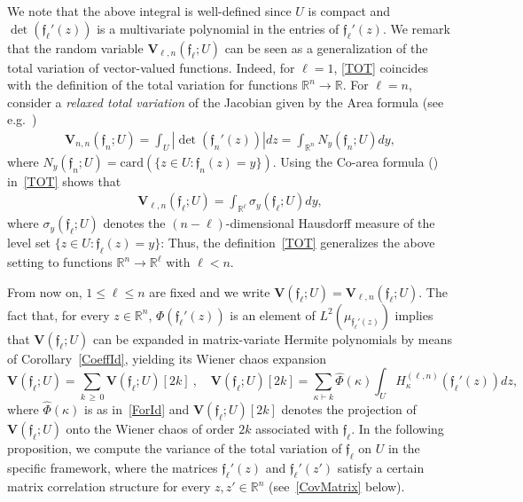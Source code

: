 \documentclass[10pt]{amsart}
\theoremstyle{definition}\newtheorem{defi}[theo]{Definition}\newtheorem{rema}[theo]{Remark}\newtheorem{exam}[theo]{Example}\newtheorem{exem}[theo]{Example}\newtheorem{nota}[theo]{Notation}
\newcommand{\card}{\mathrm{card}}
\newcommand{\bfv}{\mathbf{V}}
\newcommand{\frkf}{\mathfrak{f}}
\newcommand{\R}{\mathbb{R}}
\begin{document}
We note that the above integral is well-defined since $U$ is compact and $\det(\frkf_{\ell}'(z)) $ is a multivariate polynomial in the entries of $\frkf_{\ell}'(z)$. We remark that the random variable $\bfv_{\ell,n}(\frkf_{\ell};U)$ can be seen as a generalization of the total variation of vector-valued functions. Indeed, for $\ell=1$, \eqref{TOT} coincides with the definition of the total variation for functions $\R^n \to \R$. For $\ell=n$, \cite{Guido,Fonseca} consider a \emph{relaxed total variation} of the Jacobian given by the Area formula (see e.g.~\cite[Proposition~6.1]{AW09})
\begin{gather*}
\bfv_{n,n}(\frkf_n;U) = \int_{U} \left|\det\left(\frkf_n'(z)\right)\right| dz = \int_{\R^n} N_y(\frkf_n;U) dy,
\end{gather*}
where $N_y(\frkf_n;U)=\card(\{z \in U: \frkf_n(z)=y\})$. Using the Co-area formula (\cite[Proposition~6.13]{AW09}) in~\eqref{TOT} shows that
\begin{gather*}
\bfv_{\ell,n}(\frkf_{\ell};U) = \int_{\R^{\ell}} \sigma_y(\frkf_{\ell};U) dy,
\end{gather*}
where $\sigma_y(\frkf_{\ell};U) $ denotes the $(n-\ell)$-dimensional Hausdorff measure of the level set $\{z\in U: \frkf_{\ell}(z) = y\}$: Thus, the definition~\eqref{TOT} generalizes the above setting to functions $\R^n \to \R^{\ell}$ with $\ell<n$.

From now on, $1\leq\ell\leq n$ are fixed and we write $\bfv(\frkf_{\ell};U)=\bfv_{\ell,n}(\frkf_{\ell};U)$. The fact that, for every $z\in \R^n$, $\Phi(\frkf_{\ell}'(z))$ is an element of $L^2(\mu_{\frkf_{\ell}'(z)})$ implies that $\bfv(\frkf_{\ell};U)$ can be expanded in matrix-variate Hermite polynomials by means of Corollary~\ref{CoeffId}, yielding its Wiener chaos expansion
\begin{equation}\label{chaos}
\bfv\left(\frkf_{\ell};U\right) = \sum_{k\,\geq\,0} \bfv\left(\frkf_{\ell};U\right)[2k] \ ,
\quad \bfv\left(\frkf_{\ell};U\right)[2k] = \sum_{\kappa \vdash k} \widehat{\Phi}(\kappa) \int_U H_{\kappa}^{(\ell,n)}\left(\frkf_{\ell}'(z)\right)dz,
\end{equation}
where $\widehat{\Phi}(\kappa)$ is as in~\eqref{ForId} and $\bfv(\frkf_{\ell};U)[2k]$ denotes the projection of $\bfv(\frkf_{\ell};U)$ onto the Wiener chaos of order $2k$ associated with $\frkf_{\ell}$. In the following proposition, we compute the variance of the total variation of $\frkf_{\ell}$ on $U$ in the specific framework, where the matrices $\frkf_{\ell}'(z)$ and $\frkf_{\ell}'(z')$ satisfy a certain matrix correlation structure for every $z,z'\in \R^n$ (see~\eqref{CovMatrix} below).
\end{document}
